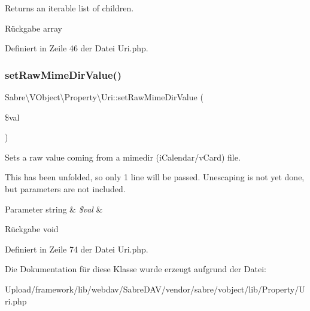 Returns an iterable list of children.

\begin{DoxyReturn}{Rückgabe}
array 
\end{DoxyReturn}


Definiert in Zeile 46 der Datei Uri.\+php.

\mbox{\label{class_sabre_1_1_v_object_1_1_property_1_1_uri_acb52709433ae724f1a1bbab7126335af}} 
\subsubsection{\texorpdfstring{set\+Raw\+Mime\+Dir\+Value()}{setRawMimeDirValue()}}
{\footnotesize\ttfamily Sabre\textbackslash{}\+V\+Object\textbackslash{}\+Property\textbackslash{}\+Uri\+::set\+Raw\+Mime\+Dir\+Value (\begin{DoxyParamCaption}\item[{}]{\$val }\end{DoxyParamCaption})}

Sets a raw value coming from a mimedir (i\+Calendar/v\+Card) file.

This has been \textquotesingle{}unfolded\textquotesingle{}, so only 1 line will be passed. Unescaping is not yet done, but parameters are not included.


\begin{DoxyParams}[1]{Parameter}
string & {\em \$val} & \\
\hline
\end{DoxyParams}
\begin{DoxyReturn}{Rückgabe}
void 
\end{DoxyReturn}


Definiert in Zeile 74 der Datei Uri.\+php.



Die Dokumentation für diese Klasse wurde erzeugt aufgrund der Datei\+:\begin{DoxyCompactItemize}
\item 
Upload/framework/lib/webdav/\+Sabre\+D\+A\+V/vendor/sabre/vobject/lib/\+Property/Uri.\+php\end{DoxyCompactItemize}
